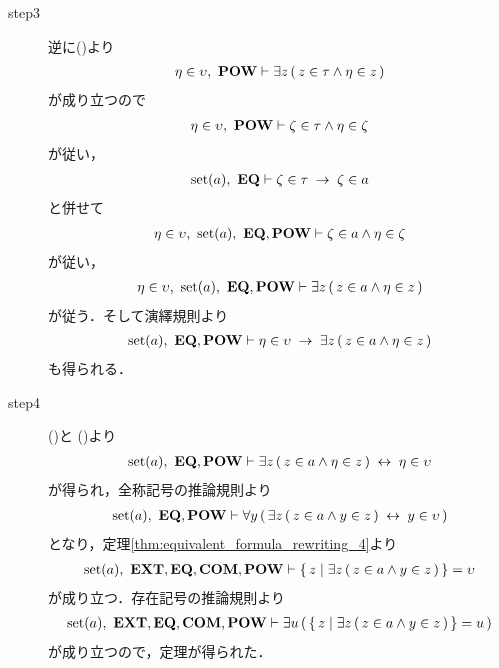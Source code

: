 \begin{sketch}
\begin{description}
			\item[step3]
				逆に()より
				\begin{align}
					\eta \in \upsilon,\ \mbox{{\bf POW}} \vdash
					\exists z\, (\, z \in \tau \wedge \eta \in z\, )
				\end{align}
				が成り立つので
				\begin{align}
					\eta \in \upsilon,\ \mbox{{\bf POW}} \vdash
					\zeta \in \tau \wedge \eta \in \zeta
				\end{align}
				が従い，
				\begin{align}
					\operatorname*{set} (a),\ \mbox{{\bf EQ}} \vdash
					\zeta \in \tau \hspace{0.25em}\rightarrow\hspace{0.25em} \zeta \in a
				\end{align}
				と併せて
				\begin{align}
					\eta \in \upsilon,\ \operatorname*{set} (a),\ \mbox{{\bf EQ}},\mbox{{\bf POW}} \vdash
					\zeta \in a \wedge \eta \in \zeta
				\end{align}
				が従い，
				\begin{align}
					\eta \in \upsilon,\ \operatorname*{set} (a),\ \mbox{{\bf EQ}},\mbox{{\bf POW}} \vdash
					\exists z\, (\, z \in a \wedge \eta \in z\, )
				\end{align}
				が従う．そして演繹規則より
				\begin{align}
					\operatorname*{set} (a),\ \mbox{{\bf EQ}},\mbox{{\bf POW}} \vdash
					\eta \in \upsilon \hspace{0.25em}\rightarrow\hspace{0.25em} \exists z\, (\, z \in a \wedge \eta \in z\, )
					\label{fom:union_of_a_set_is_a_set_3}
				\end{align}
				も得られる．
				
			\item[step4]
				()と
				()より
				\begin{align}
					\operatorname*{set} (a),\ \mbox{{\bf EQ}},\mbox{{\bf POW}} \vdash
					\exists z\, (\, z \in a \wedge \eta \in z\, ) \hspace{0.25em}\leftrightarrow\hspace{0.25em} \eta \in \upsilon
				\end{align}
				が得られ，全称記号の推論規則より
				\begin{align}
					\operatorname*{set} (a),\ \mbox{{\bf EQ}},\mbox{{\bf POW}} \vdash
					\forall y\, (\, \exists z\, (\, z \in a \wedge y \in z\, ) \hspace{0.25em}\leftrightarrow\hspace{0.25em} y \in \upsilon\, )
				\end{align}
				となり，定理\ref{thm:equivalent_formula_rewriting_4}より
				\begin{align}
					\operatorname*{set} (a),\ \mbox{{\bf EXT}},\mbox{{\bf EQ}},\mbox{\bf COM},\mbox{{\bf POW}} \vdash
					\left\{\, z \mid \exists z\, (\, z \in a \wedge y \in z\, )\, \right\} = \upsilon
				\end{align}
				が成り立つ．存在記号の推論規則より
				\begin{align}
					\operatorname*{set} (a),\ \mbox{{\bf EXT}},\mbox{{\bf EQ}},\mbox{\bf COM},\mbox{{\bf POW}} \vdash
					\exists u\, (\, \left\{\, z \mid \exists z\, (\, z \in a \wedge y \in z\, )\, \right\} = u\, )
				\end{align}
				が成り立つので，定理が得られた．
				\QED
		\end{description}
	\end{sketch}
	
